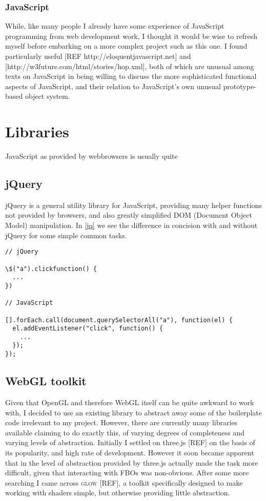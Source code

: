 \documentclass[12pt,twoside,notitlepage]{report}
\begin{document}
\subsubsection{JavaScript}
While, like many people I already have some experience of JavaScript programming from web development work, I thought it would be wise to refresh myself before embarking on a more complex project such as this one. I found particularly useful [REF http://eloquentjavascript.net] and [http://w3future.com/html/stories/hop.xml], both of which are unusual among texts on JavaScript in being willing to discuss the more sophisticated functional aspects of JavaScript, and their relation to JavaScript's own unusual prototype-based object system.


\section{Libraries}
JavaScript as provided by webbrowsers is usually quite 

\subsection{jQuery}
jQuery is a general utility library for JavaScript, providing many helper functions not provided by browsers, and also greatly simplified DOM (Document Object Model) manipulation. In \ref{jq} we see the difference in concision with and without jQuery for some simple common tasks.
\begin{verbatim}
// jQuery

\$("a").clickfunction() {
  ...
})

// JavaScript

[].forEach.call(document.querySelectorAll("a"), function(el) {
  el.addEventListener("click", function() {
    ...
  });
});
\end{verbatim}

\subsection{WebGL toolkit}
Given that OpenGL and therefore WebGL itself can be quite awkward to work with, I decided to use an existing library to abstract away some of the boilerplate code irrelevant to my project. However, there are currently many libraries available claiming to do exactly this, of varying degrees of completeness and varying levels of abstraction. Initially I settled on three.js [REF] on the basis of its popularity, and high rate of development. However it soon became apparent that in the level of abstraction provided by three.js actually made the task more difficult, given that interacting with FBOs was non-obvious. After some more searching I came across \textsc{glow} [REF], a toolkit specifically designed to make working with shaders simple, but otherwise providing little abstraction.
\end{document}
